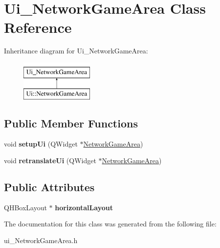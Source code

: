 \hypertarget{class_ui___network_game_area}{\section{Ui\-\_\-\-Network\-Game\-Area Class Reference}
\label{class_ui___network_game_area}
}
Inheritance diagram for Ui\-\_\-\-Network\-Game\-Area\-:\begin{figure}[H]
\begin{center}
\leavevmode
\includegraphics[height=2.000000cm]{class_ui___network_game_area}
\end{center}
\end{figure}
\subsection*{Public Member Functions}
\begin{DoxyCompactItemize}
\item 
\hypertarget{class_ui___network_game_area_ae185b7ca78d7cd97189c75f5704e9d47}{void {\bfseries setup\-Ui} (Q\-Widget $\ast$\hyperlink{class_network_game_area}{Network\-Game\-Area})}\label{class_ui___network_game_area_ae185b7ca78d7cd97189c75f5704e9d47}

\item 
\hypertarget{class_ui___network_game_area_a5cb2aa37c99e927063b4d94478ca625d}{void {\bfseries retranslate\-Ui} (Q\-Widget $\ast$\hyperlink{class_network_game_area}{Network\-Game\-Area})}\label{class_ui___network_game_area_a5cb2aa37c99e927063b4d94478ca625d}

\end{DoxyCompactItemize}
\subsection*{Public Attributes}
\begin{DoxyCompactItemize}
\item 
\hypertarget{class_ui___network_game_area_a39f9159e2c21f6d254e47e391c84b909}{Q\-H\-Box\-Layout $\ast$ {\bfseries horizontal\-Layout}}\label{class_ui___network_game_area_a39f9159e2c21f6d254e47e391c84b909}

\end{DoxyCompactItemize}


The documentation for this class was generated from the following file\-:\begin{DoxyCompactItemize}
\item 
ui\-\_\-\-Network\-Game\-Area.\-h\end{DoxyCompactItemize}

